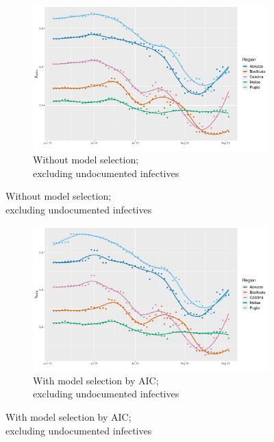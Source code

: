 \documentclass[12pt]{article}
\begin{document}
\begin{appendices}
		\begin{figure}[H]
    	    \centering
    	    \begin{subfigure}{\textwidth}
    	      \centering
    	      \includegraphics[width=0.94\linewidth]{output/model_within_lag14_betawithin_Sud_rolling.pdf}
    	      \caption{Without model selection; \\ excluding undocumented infectives}
    	      \label{fig:beta_within_over_time_sud_regular}
    	    \end{subfigure}\newline
        \end{figure}
        \begin{figure}[H]\ContinuedFloat
    	    \begin{subfigure}{\textwidth}
    	      \centering
    	      \includegraphics[width=0.94\linewidth]{output/model_within_lag14_betawithin_Sud_aic_rolling.pdf}
    	      \caption{With model selection by AIC; \\ excluding undocumented infectives}
    	      \label{fig:beta_within_over_time_sud_aic}
    	    \end{subfigure}

\end{figure}
\end{appendices}
\end{document}

